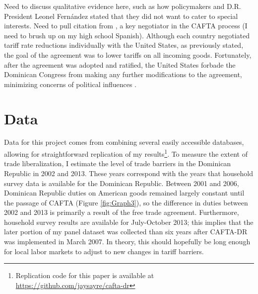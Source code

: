 \documentclass[12pt]{article}
\begin{document}
Need to discuss qualitative evidence here, such as how policymakers
and D.R. President Leonel Fern\'{a}ndez stated that they did
not want to cater to special interests. Need to pull citation from 
\citet{guzman}, a key negotiator in the CAFTA process (I need to brush up on my high school Spanish).
Although each country negotiated tariff rate reductions individually with the
United States, as previously stated, the goal of the agreement was to lower tariffs on all
incoming goods. Fortunately, after the agreement was adopted and ratified, the United States
forbade the Dominican Congress from making any further modifications to the agreement, 
minimizing concerns of political influences \citep{usambassador}.

\vspace{-10pt}
\section{Data}
\label{sec:Data}
Data for this project comes from combining several easily accessible databases, allowing
for straightforward replication of my results\footnote{Replication code for this paper is available
at \url{https://github.com/jaysayre/cafta-dr}}.
To measure the extent of trade liberalization, I estimate the level of trade barriers in the
Dominican Republic in 2002 and 2013. These years correspond with the years that household
survey data is available for the Dominican Republic. 
Between 2001 and 2006, Dominican Republic duties on American goods 
remained largely constant until the passage of CAFTA (Figure \ref{fig:Graph3}), so the 
difference in duties between 2002 and 2013 is primarily a result of the free trade agreement.
Furthermore, household survey results are available for July-October 2013; this implies
that the later portion of my panel dataset was collected than six years after CAFTA-DR was implemented 
in March 2007. In theory, this should hopefully be long enough for local labor markets to adjust 
to new changes in tariff barriers.
\end{document}
